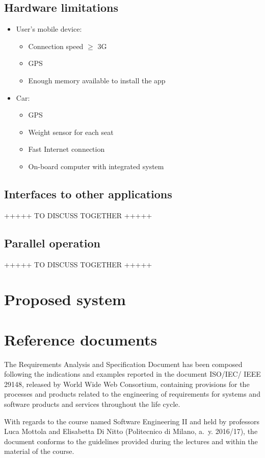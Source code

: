 \subsection{Hardware limitations}
\begin{itemize}
	\item User's mobile device:
\begin{itemize}
	\item Connection speed \(\geqslant\) 3G
	\item GPS
	\item Enough memory available to install the app
\end{itemize}
	\item Car:
	\begin{itemize}
	\item GPS
	\item Weight sensor for each seat
	\item Fast Internet connection
	\item On-board computer with integrated system
\end{itemize}
\end{itemize}

\subsection{Interfaces to other applications}
+++++ TO DISCUSS TOGETHER +++++

\subsection{Parallel operation}
+++++ TO DISCUSS TOGETHER +++++

\section{Proposed system}

\section{Reference documents}
The Requirements Analysis and Specification Document has been composed following the indications and examples reported in the document ISO/IEC/ IEEE 29148, released by World Wide Web Consortium, containing provisions for the processes and products related to the engineering of requirements for systems and software products and services throughout the life cycle.

With regards to the course named Software Engineering II and held by professors Luca Mottola and Elisabetta Di Nitto (Politecnico di Milano, a.~y. 2016/17), the document conforms to the guidelines provided during the lectures and within the material of the course.